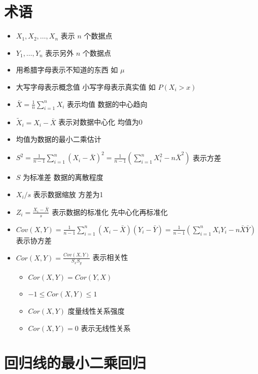 \documentclass[]{book}
\providecommand{\tightlist}{%
  \setlength{\itemsep}{0pt}\setlength{\parskip}{0pt}}
\begin{document}
\hypertarget{ux672fux8bed}{%
\section{术语}\label{ux672fux8bed}}

\begin{itemize}
\tightlist
\item
  \(X_1, X_2, \ldots, X_n\) 表示 \(n\) 个数据点
\item
  \(Y_1, \ldots , Y_n\) 表示另外 \(n\) 个数据点
\item
  用希腊字母表示不知道的东西 如 \(\mu\)
\item
  大写字母表示概念值 小写字母表示真实值 如 \(P(X_i > x)\)
\item
  \(\bar X = \frac{1}{n}\sum_{i=1}^n X_i\) 表示均值 数据的中心趋向
\item
  \(\tilde X_i = X_i - \bar X\) 表示对数据中心化 均值为0
\item
  均值为数据的最小二乘估计
\item
  \(S^2 = \frac{1}{n-1} \sum_{i=1}^n (X_i - \bar X)^2 = \frac{1}{n-1} \left( \sum_{i=1}^n X_i^2 - n \bar X ^ 2 \right)\) 表示方差
\item
  \(S\) 为标准差 数据的离散程度
\item
  \(X_i / s\) 表示数据缩放 方差为1
\item
  \(Z_i = \frac{X_i - \bar X}{s}\) 表示数据的标准化 先中心化再标准化
\item
  \(Cov(X, Y) = \frac{1}{n-1}\sum_{i=1}^n (X_i - \bar X) (Y_i - \bar Y)= \frac{1}{n-1}\left( \sum_{i=1}^n X_i Y_i - n \bar X \bar Y\right)\) 表示协方差
\item
  \(Cor(X, Y) = \frac{Cov(X, Y)}{S_x S_y}\) 表示相关性

  \begin{itemize}
  \tightlist
  \item
    \(Cor(X, Y) = Cor(Y, X)\)
  \item
    \(-1 \leq Cor(X, Y) \leq 1\)
  \item
    \(Cor(X, Y)\) 度量线性关系强度
  \item
    \(Cor(X, Y) = 0\) 表示无线性关系
  \end{itemize}
\end{itemize}

\hypertarget{ux56deux5f52ux7ebfux7684ux6700ux5c0fux4e8cux4e58ux56deux5f52}{%
\section{回归线的最小二乘回归}\label{ux56deux5f52ux7ebfux7684ux6700ux5c0fux4e8cux4e58ux56deux5f52}}
\end{document}
